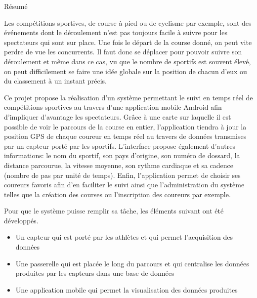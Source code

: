 %
%







\pagestyle{fancy}

\LARGE{Résumé}

\begin{normalsize}
Les compétitions sportives, de course à pied ou de cyclisme par exemple, sont des événements dont le déroulement n'est pas toujours facile à suivre pour les spectateurs qui sont sur place. Une fois le départ de la course donné, on peut vite perdre de vue les concurrents. Il faut donc se déplacer pour pouvoir suivre son déroulement et même dans ce cas, vu que le nombre de sportifs est souvent élevé, on peut difficilement se faire une idée globale sur la position de chacun d'eux ou du classement à un instant précis.

Ce projet propose la réalisation d’un système permettant le suivi en temps réel de compétitions sportives au travers d’une application mobile Android afin d'impliquer d'avantage les spectateurs. Grâce à une carte sur laquelle il est possible de voir le parcours de la course en entier, l'application tiendra à jour la position GPS de chaque coureur en temps réel au travers de données transmises par un capteur porté par les sportifs. L'interface propose également d'autres informations: le nom du sportif, son pays d'origine, son numéro de dossard, la distance parcourue, la vitesse moyenne, son rythme cardiaque et sa cadence (nombre de pas par unité de temps). Enfin, l'application permet de choisir ses coureurs favoris afin d'en faciliter le suivi ainsi que l'administration du système telles que la création des courses ou l'inscription des coureurs par exemple.

Pour que le système puisse remplir sa tâche, les éléments suivant ont été développés.

\begin{itemize}
\item Un capteur qui est porté par les athlètes et qui permet l'acquisition des données
\item Une passerelle qui est placée le long du parcours et qui centralise les données produites par les capteurs dans une base de données
\item Une application mobile qui permet la visualisation des données produites
\end{itemize}


\end{normalsize}
